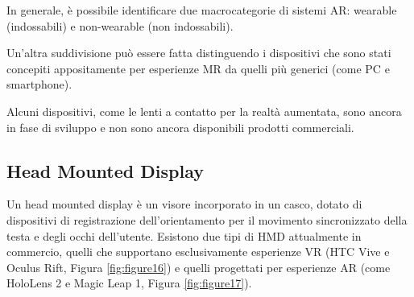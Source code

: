 In generale, è possibile identificare due macrocategorie di sistemi AR: wearable (indossabili) e non-wearable (non indossabili). 

Un’altra suddivisione può essere fatta distinguendo i dispositivi che sono stati concepiti appositamente per esperienze MR da quelli più generici (come PC e smartphone).

Alcuni dispositivi, come le lenti a contatto per la realtà aumentata, sono ancora in fase di sviluppo e non sono ancora disponibili prodotti commerciali.

\subsection{Head Mounted Display}
Un head mounted display è un visore incorporato in un casco, dotato di dispositivi di registrazione dell'orientamento per il movimento sincronizzato della testa e degli occhi dell’utente.
Esistono due tipi di HMD attualmente in commercio, quelli che supportano esclusivamente esperienze VR (HTC Vive e Oculus Rift, Figura \ref{fig:figure16}) e quelli progettati per esperienze AR (come HoloLens 2 e Magic Leap 1, Figura \ref{fig:figure17}).


